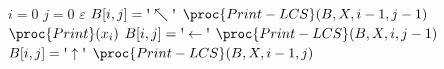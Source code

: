 \begin{codebox}
\li \If $i = 0$ \Or $j = 0$
\li \Then
		\Return $\varepsilon$
	\End
\li \If $B[i,j] = \textnormal{\textquotesingle}\nwarrow\textnormal{\textquotesingle}$
\li	\Then
		$\proc{Print-LCS}(B,X,i-1,j-1)$
\li     $\proc{Print}(x_i)$
\li \ElseIf $B[i,j] = \textnormal{\textquotesingle}\leftarrow\textnormal{\textquotesingle}$
\li \Then
		$\proc{Print-LCS}(B,X,i,j-1)$
\li \ElseNoIf
		\Comment $B[i,j] = \textnormal{\textquotesingle}\uparrow\textnormal{\textquotesingle}$
\li 	$\proc{Print-LCS}(B,X,i-1,j)$
	\End
\end{codebox}
